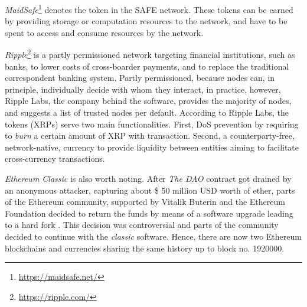 \emph{MaidSafe}\footnote{\url{https://maidsafe.net/}} denotes the token in the SAFE network. These tokens can be earned by providing storage or computation resources to the network, and have to be spent to access and consume resources by the network.

\emph{Ripple}\footnote{\url{https://ripple.com/}} is a partly permissioned network targeting financial institutions, such as banks, to lower costs of cross-boarder payments, and to replace the traditional correspondent banking system. Partly permissioned, because nodes can, in principle, individually decide with whom they interact, in practice, however, Ripple Labs, the company behind the software, provides the majority of nodes, and suggests a list of trusted nodes per default. According to Ripple Labs, the tokens (XRPs) serve two main functionalities. First, \ac{DoS} prevention by requiring to \emph{burn} a certain amount of XRP with transaction. Second, a counterparty-free, network-native, currency to provide liquidity between entities aiming to facilitate cross-currency transactions. 

\emph{Ethereum Classic} is also worth noting. After \emph{The DAO} contract got drained by an anonymous attacker, capturing about \$ 50 million USD worth of ether, parts of the Ethereum community, supported by Vitalik Buterin and the Ethereum Foundation decided to return the funds by means of a software upgrade leading to a hard fork \parencite{buterin2015fork}. This decision was controversial and parts of the community decided to continue with the \emph{classic} software. Hence, there are now two Ethereum blockchains and currencies sharing the same history up to block no. 1920000. 

